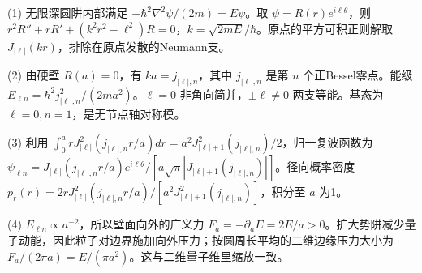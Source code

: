 (1) 无限深圆阱内部满足 \(-\hbar^2\nabla^2\psi/(2m)=E\psi\)。取 \(\psi=R(r)e^{i\ell\theta}\)，则 \(r^2R''+rR'+(k^2r^2-\ell^2)R=0\)，\(k=\sqrt{2mE}/\hbar\)。原点的平方可积正则解取 \(J_{|\ell|}(kr)\)，排除在原点发散的Neumann支。

(2) 由硬壁 \(R(a)=0\)，有 \(ka=j_{|\ell|,n}\)，其中 \(j_{|\ell|,n}\) 是第 \(n\) 个正Bessel零点。能级 \(\boxed{E_{\ell n}=\hbar^2j_{|\ell|,n}^2/(2ma^2)}\)。\(\ell=0\) 非角向简并，\(\pm\ell\ne0\) 两支等能。基态为 \(\ell=0,n=1\)，是无节点轴对称模。

(3) 利用 \(\int_0^arJ_{|\ell|}^2(j_{|\ell|,n}r/a)dr=a^2J_{|\ell|+1}^2(j_{|\ell|,n})/2\)，归一复波函数为 \(\psi_{\ell n}=J_{|\ell|}(j_{|\ell|,n}r/a)e^{i\ell\theta}/[a\sqrt\pi|J_{|\ell|+1}(j_{|\ell|,n})|]\)。径向概率密度 \(p_r(r)=2rJ_{|\ell|}^2(j_{|\ell|,n}r/a)/[a^2J_{|\ell|+1}^2(j_{|\ell|,n})]\)，积分至 \(a\) 为1。

(4) \(E_{\ell n}\propto a^{-2}\)，所以壁面向外的广义力 \(\boxed{F_a=-\partial_aE=2E/a>0}\)。扩大势阱减少量子动能，因此粒子对边界施加向外压力；按圆周长平均的二维边缘压力大小为 \(F_a/(2\pi a)=E/(\pi a^2)\)。这与二维量子维里缩放一致。
